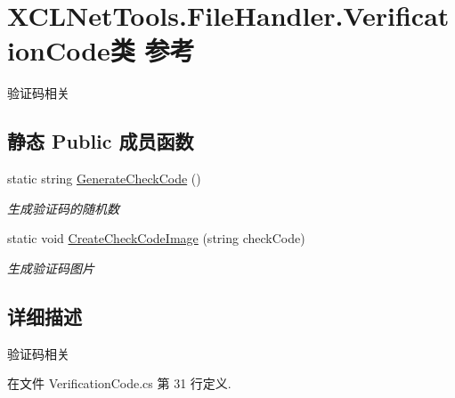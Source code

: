 \hypertarget{class_x_c_l_net_tools_1_1_file_handler_1_1_verification_code}{\section{X\-C\-L\-Net\-Tools.\-File\-Handler.\-Verification\-Code类 参考}
\label{class_x_c_l_net_tools_1_1_file_handler_1_1_verification_code}
}


验证码相关  


\subsection*{静态 Public 成员函数}
\begin{DoxyCompactItemize}
\item 
static string \hyperlink{class_x_c_l_net_tools_1_1_file_handler_1_1_verification_code_af4beced22b07b395e6ae37452a895f32}{Generate\-Check\-Code} ()
\begin{DoxyCompactList}\small\item\em 生成验证码的随机数 \end{DoxyCompactList}\item 
static void \hyperlink{class_x_c_l_net_tools_1_1_file_handler_1_1_verification_code_acde0d83935e0d55da7a29725026a72e9}{Create\-Check\-Code\-Image} (string check\-Code)
\begin{DoxyCompactList}\small\item\em 生成验证码图片 \end{DoxyCompactList}\end{DoxyCompactItemize}


\subsection{详细描述}
验证码相关 



在文件 Verification\-Code.\-cs 第 31 行定义.



